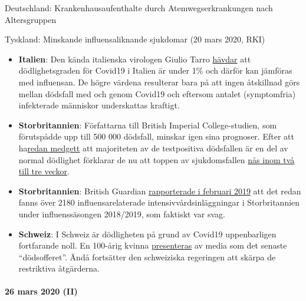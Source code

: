 Deutschland: Krankenhausaufenthalte durch Atemwegserkrankungen nach
Altersgruppen

Tyskland: Minskande influensaliknande sjukdomar (20 mars 2020, RKI)

\begin{itemize}
\tightlist
\item
  \textbf{Italien}: Den kända italienska virologen Giulio Tarro
  \href{https://www.cybermednews.eu/index.php/it/health/70871-interview-to-the-virologist-giulio-tarro-the-death-rate-of-covid-19-is-less-than-1-as-confirmed-by-the-national-institute-of-allergy-and-infectious-diseases}{hävdar}
  att dödlighetsgraden för Covid19 i Italien är under 1\% och därför kan
  jämföras med influensan. De högre värdena resulterar bara på att ingen
  åtskillnad görs mellan dödsfall med och genom Covid19 och eftersom
  antalet (symptomfria) infekterade människor underskattas kraftigt.
\item
  \textbf{Storbritannien}: Författarna till British Imperial
  College-studien, som förutspådde upp till 500 000 dödsfall, minskar
  igen sina prognoser. Efter att
  ha\href{https://www.bbc.com/news/health-51979654}{redan medgett} att
  majoriteten av de testpositiva dödsfallen är en del av normal
  dödlighet förklarar de nu att toppen av sjukdomsfallen
  \href{https://www.thetimes.co.uk/article/nhs-now-likely-to-cope-with-coronavirus-says-key-scientist-rn5m6nggk}{nås
  inom två till tre veckor}.
\item
  \textbf{Storbritannien}: British Guardian
  \href{https://www.theguardian.com/society/2019/feb/20/britons-urged-to-get-flu-vaccine-as-critical-cases-rise-above-2000}{rapporterade
  i februari 2019} att det redan fanns över 2180 influensarelaterade
  intensivvårdsinläggningar i Storbritannien under influenssäsongen
  2018/2019, som faktiskt var svag.
\item
  \textbf{Schweiz}: I Schweiz är dödligheten på grund av Covid19
  uppenbarligen fortfarande noll. En 100-årig kvinna
  \href{https://www.nau.ch/ort/basel/drei-weitere-covid-19-todesfalle-in-basel-stadt-65684099}{presenteras}
  av media som det senaste ``dödsofferet''. Ändå fortsätter den
  schweiziska regeringen att skärpa de restriktiva åtgärderna.
\end{itemize}

\hypertarget{26-mars-2020-ii}{%
\paragraph{26 mars 2020 (II)}\label{26-mars-2020-ii}}

